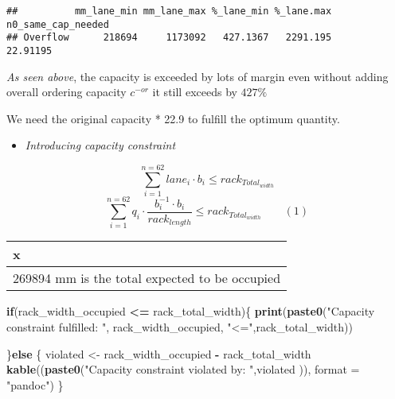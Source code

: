 \documentclass[
]{article}
\newenvironment{Shaded}{\begin{snugshade}}{\end{snugshade}}
\newcommand{\CommentTok}[1]{\textcolor[rgb]{0.56,0.35,0.01}{\textit{#1}}}
\newcommand{\ControlFlowTok}[1]{\textcolor[rgb]{0.13,0.29,0.53}{\textbf{#1}}}
\newcommand{\DataTypeTok}[1]{\textcolor[rgb]{0.13,0.29,0.53}{#1}}
\newcommand{\KeywordTok}[1]{\textcolor[rgb]{0.13,0.29,0.53}{\textbf{#1}}}
\newcommand{\NormalTok}[1]{#1}
\newcommand{\OperatorTok}[1]{\textcolor[rgb]{0.81,0.36,0.00}{\textbf{#1}}}
\newcommand{\StringTok}[1]{\textcolor[rgb]{0.31,0.60,0.02}{#1}}
\providecommand{\tightlist}{%
  \setlength{\itemsep}{0pt}\setlength{\parskip}{0pt}}
\begin{document}
\begin{verbatim}
##          mm_lane_min mm_lane_max %_lane_min %_lane.max n0_same_cap_needed
## Overflow      218694     1173092   427.1367   2291.195           22.91195
\end{verbatim}

\emph{As seen above}, the capacity is exceeded by lots of margin even
without adding overall ordering capacity \(c^{-or}\) it still exceeds by
\(427\%\)

We need the original capacity * 22.9 to fulfill the optimum quantity.

\begin{itemize}
\tightlist
\item
  \emph{Introducing capacity constraint}
\end{itemize}

\[\sum_{i=1}^{n=62}lane_i \cdot b_i\le rack_{Total_{width}}\]
\[\sum_{i=1}^{n=62} q_i \cdot \frac {b_i^{-1} \cdot b_i}{rack_{length}} \le rack_{Total_{width}} \quad \quad (1)\]

\begin{Shaded}
\end{Shaded}

\begin{tabular}{l}
\hline
x\\
\hline
269894 mm  is the total expected to be occupied\\
\hline
\end{tabular}

\begin{Shaded}
\begin{Highlighting}[]
\ControlFlowTok{if}\NormalTok{(rack_width_occupied }\OperatorTok{<=}\StringTok{ }\NormalTok{rack_total_width)\{}
  \KeywordTok{print}\NormalTok{(}\KeywordTok{paste0}\NormalTok{(}\StringTok{"Capacity constraint fulfilled: "}\NormalTok{, rack_width_occupied, }\StringTok{"<="}\NormalTok{,rack_total_width))}
 
\NormalTok{\}}\ControlFlowTok{else}\NormalTok{ \{}
\NormalTok{  violated <-}\StringTok{ }\NormalTok{rack_width_occupied }\OperatorTok{-}\StringTok{ }\NormalTok{rack_total_width}
  \KeywordTok{kable}\NormalTok{((}\KeywordTok{paste0}\NormalTok{(}\StringTok{"Capacity constraint violated by: "}\NormalTok{,violated )), }\DataTypeTok{format =} \StringTok{"pandoc"}\NormalTok{)}
\NormalTok{\}}
\end{Highlighting}
\end{Shaded}
\end{document}
